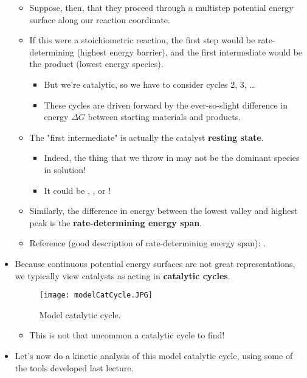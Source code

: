 \documentclass[../notes.tex]{subfiles}
\begin{document}
\begin{itemize}
\begin{itemize}
        \item Suppose, then, that they proceed through a multistep potential energy surface along our reaction coordinate.
        \item If this were a stoichiometric reaction, the first step would be rate-determining (highest energy barrier), and the first intermediate would be the product (lowest energy species).
        \begin{itemize}
            \item But we're catalytic, so we have to consider cycles 2, 3, \dots
            \item These cycles are driven forward by the ever-so-slight difference in energy $\Delta G$ between starting materials and products.
        \end{itemize}
        \item The "first intermediate" is actually the catalyst \textbf{resting state}.
        \begin{itemize}
            \item Indeed, the thing that we throw in may not be the dominant species in solution!
            \item It could be , , or !
        \end{itemize}
        \item Similarly, the difference in energy between the lowest valley and highest peak is the \textbf{rate-determining energy span}.
        \item Reference (good description of rate-determining energy span): \textcite{bib:modelCatPES}.
    \end{itemize}
    \item Because continuous potential energy surfaces are not great representations, we typically view catalysts as acting in \textbf{catalytic cycles}.
    \begin{figure}[h!]
        \centering
        \texttt{[image: modelCatCycle.JPG]}
        \caption{Model catalytic cycle.}
        \label{fig:modelCatCycle}
    \end{figure}
    \begin{itemize}
        \item This is not that uncommon a catalytic cycle to find!
    \end{itemize}
    \item Let's now do a kinetic analysis of this model catalytic cycle, using some of the tools developed last lecture.
    \begin{figure}[h!]

\end{figure}
\end{itemize}
\end{document}
